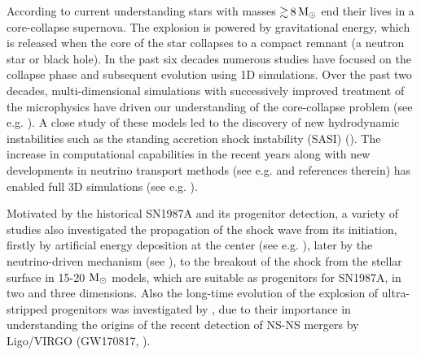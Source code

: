 \documentclass[fleqn,usenatbib]{mnras}
\newcommand{\solm}{\ensuremath{\rm{M_{\odot}}}\xspace}
\begin{document}
According to current understanding stars with masses 
$\mathord{\gtrsim}\,8\, \solm$ end their lives in a core-collapse 
supernova. The explosion is powered by gravitational energy, 
which is released when the core of the star collapses to a compact 
remnant (a neutron star or black hole). In the past six decades 
numerous studies have focused on the collapse phase and subsequent 
evolution using 1D simulations. Over the past two decades, 
multi-dimensional simulations with successively improved treatment 
of the microphysics have driven our understanding of the core-collapse 
problem (see e.g. \citealt{Janka2012,Burrows2013,Janka2016}). 
A close study of these models led to the discovery of new hydrodynamic 
instabilities such as the standing accretion shock instability (SASI) 
(\citealt{Blondin2003,Foglizzo2007}). The increase in computational 
capabilities in the recent years along with new developments in 
neutrino transport methods (see e.g. 
\citealt{Buras2006,Takiwaki2012,OConnor2018,Skinner2019,Glas2019} and references therein)
has enabled full 3D simulations (see e.g. 
\citealt{Melson2015a,Summa2016,Mueller2017,Mueller2018,Vartanyan2018,Melson2019,Vartanyan2019,Burrows2019}). 

Motivated by the historical SN1987A and its progenitor detection, a 
variety of studies also investigated the propagation of the shock 
wave from its initiation, firstly by artificial energy deposition 
at the center (see e.g. \citealt{Mueller1991}), later by the 
neutrino-driven mechanism (see \citealt{Kifonidis2003,Hammer2010,Wongwathanarat2015}), 
to the breakout of the shock from the stellar surface in 15-20 $\solm$ models, 
which are suitable as progenitors for SN1987A, in two and three dimensions. 
Also the long-time evolution of the explosion of ultra-stripped 
progenitors was investigated by \cite{Mueller2018}, due to their 
importance in understanding the origins of the recent detection of 
NS-NS mergers by Ligo/VIRGO (GW170817, \citealt{Abbott2017}).
\end{document}
